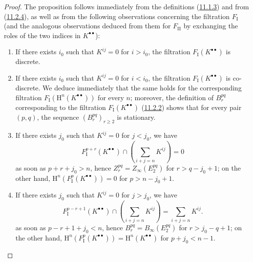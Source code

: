 \begin{proof}
The proposition follows immediately from the definitions
(\hyperref[0.11.1.3]{11.1.3}) and from
(\hyperref[0.11.2.4]{11.2.4}), as well as from the following observations
concerning the filtration $F_{\mathrm I}$ (and the analogous observations
deduced from them for $F_{\mathrm{II}}$ by exchanging the roles of the two indices
in $K^{\bullet\bullet}$):
\begin{enumerate}
  \item[$1^\circ$] If there exists $i_0$ such that $K^{ij}=0$ for $i>i_0$, the
    filtration $F_{\mathrm I}(K^{\bullet\bullet})$ is discrete.
  \item[$2^\circ$] If there exists $i_0$ such that $K^{ij}=0$ for $i<i_0$, the
    filtration $F_{\mathrm I}(K^{\bullet\bullet})$ is co-discrete. We
    deduce immediately that the same holds for the corresponding filtration
    $F_{\mathrm I}(\mathrm H^n(K^{\bullet\bullet}))$ for every $n$;
    moreover, the definition of $B_r^{pq}$ corresponding to the filtration
    $F_{\mathrm I}(K^{\bullet\bullet})$
    (\hyperref[0.11.2.2]{11.2.2}) shows that for every pair $(p,q)$, the
    sequence $(B_r^{pq})_{r\geq2}$ is stationary.
  \item[$3^\circ$] If there exists $j_0$ such that $K^{ij}=0$ for $j<j_0$, we have
    \[
      F_{\mathrm I}^{p+r}(K^{\bullet\bullet})
      \cap\left(\sum_{i+j=n}K^{ij}\right)=0
    \]
    as soon as $p+r+j_0>n$, hence
    $Z_r^{pq}=Z_\infty(E_2^{pq})$ for $r>q-j_0+1$; on the other hand,
    $\mathrm H^n(F_{\mathrm I}^p(K^{\bullet\bullet}))=0$ for
    $p>n-j_0+1$.
  \item[$4^\circ$] If there exists $j_0$ such that $K^{ij}=0$ for $j>j_0$, we have
    \[
      F_{\mathrm I}^{p-r+1}(K^{\bullet\bullet})
      \cap\left(\sum_{i+j=n}K^{ij}\right)=\sum_{i+j=n}K^{ij}.
    \]
    as soon as $p-r+1+j_0<n$, hence
    $B_r^{pq}=B_\infty(E_2^{pq})$ for $r>j_0-q+1$; on the other hand,
    $\mathrm H^n(F_{\mathrm I}^p(K^{\bullet\bullet}))
    =\mathrm H^n(K^{\bullet\bullet})$ for $p+j_0<n-1$.
\end{enumerate}
\end{proof}

